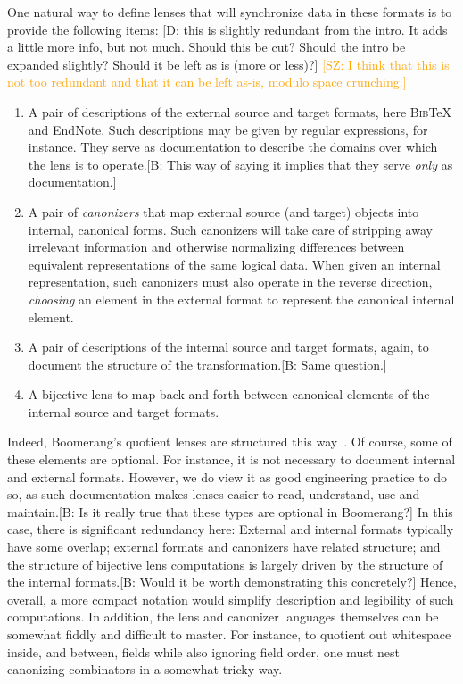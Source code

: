 \documentclass[acmsmall,review,anonymous]{acmart}
\newcommand{\FINISH}[3]{\ifdraft\textcolor{#1}{[#2: #3]}\fi}
\newcommand{\bcp}[1]{\FINISH{dkred}{B}{#1}}
\newcommand{\dpw}[1]{\FINISH{dkblue}{D}{#1}} %
\newcommand{\saz}[1]{\FINISH{orange}{SZ}{#1}}
\newcommand{\bibtex}{\textsc{Bib}\TeX{}}
\begin{document}
One natural way to define lenses that will synchronize data in these formats
is to provide the following items: \dpw{this is slightly redundant from the intro.  It
adds a little more info, but not much.  Should this be cut?  Should the intro be expanded
slightly?  Should it be left as is (more or less)?} \saz{I think that this is
not too redundant and that it can be left as-is, modulo space crunching.}

\begin{enumerate}
  \item A pair of descriptions of the external source and target formats, here
    \bibtex{} and EndNote.
  Such descriptions may be given by regular expressions, for instance.
  They serve as documentation to describe the domains over which the lens
  is to operate.\bcp{This way of saying it implies that they serve {\em
      only} as documentation.}
  \item A pair of \emph{canonizers} that map external source (and target)
  objects into internal, canonical forms.  Such canonizers will take
  care of stripping away irrelevant information and otherwise normalizing
  differences between equivalent representations of the same logical data.
  When given an internal representation, such canonizers must also operate
  in the reverse direction, \emph{choosing} an element in the external format
  to represent the canonical internal element.
  \item A pair of descriptions of the internal source and
  target formats, again, to document the structure of the
  transformation.\bcp{Same question.}
  \item A bijective lens to map back and forth between canonical elements
  of the internal source and target formats.
\end{enumerate}

\noindent
Indeed, Boomerang's quotient lenses are structured this
way~\cite{quotientlenses}.
Of course, some of these elements are optional.  For instance, it is
not necessary to document internal and external formats.  However, we do
view it as good engineering practice to do so, as such documentation makes
lenses easier to read, understand, use and maintain.\bcp{Is it really true
  that these types are optional in Boomerang?}  In this case, there is 
significant redundancy here:  External and internal formats
typically have some overlap; external formats and canonizers have related
structure; and the structure of bijective lens computations is largely driven
by the structure of the internal formats.\bcp{Would it be worth
  demonstrating this concretely?}  Hence, overall, a more compact
notation would simplify description and legibility of such computations.
In addition,
the lens and canonizer languages themselves can be somewhat fiddly and
difficult to
master.  For instance, to quotient out whitespace inside, and between,
fields while also ignoring field order, one must nest canonizing combinators
in a somewhat tricky way.
\end{document}

